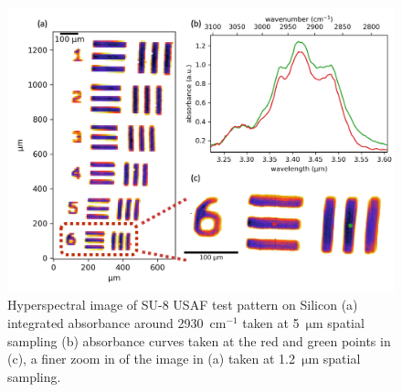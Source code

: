 \documentclass{optica-article}
\begin{document}
\begin{figure}[H]
    \centering
    \includegraphics[width=\linewidth]{su8_image.png}
    \caption{Hyperspectral image of SU-8 USAF test pattern on Silicon (a) integrated absorbance around \mbox{2930 $\mathrm{cm^{-1}}$} taken at \mbox{5 $\mathrm{\mu m}$} spatial sampling (b) absorbance curves taken at the red and green points in (c), a finer zoom in of the image in (a) taken at \mbox{1.2 $\mathrm{\mu m}$} spatial sampling.}
    \label{fig:su8}
\end{figure}
\end{document}
